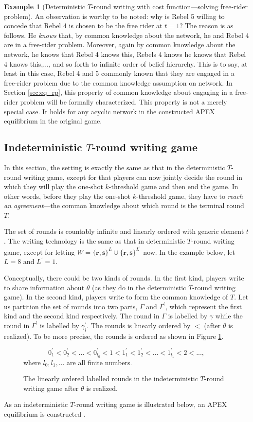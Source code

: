\documentclass[12pt,letter]{article}
\theoremstyle{definition}
\newtheorem{example}{Example}
\theoremstyle{remark}
\theoremstyle{claim}
\begin{document}
\begin{example}[Deterministic $T$-round writing with cost function---solving free-rider problem]
An observation is worthy to be noted: why is Rebel 5 willing to concede that Rebel 4 is chosen to be the free rider at $t=1$? The reason is as follows. He \textit{knows} that, by common knowledge about the network, he and Rebel 4 are in a free-rider problem. Moreover, again by common knowledge about the network, he knows that Rebel 4 knows this, Rebels 4 knows he knows that Rebel 4 knows this,..., and so forth to infinite order of belief hierarchy. This is to say, at least in this case, Rebel 4 and 5 commonly known that they are engaged in a free-rider problem due to the common knowledge assumption on network. In Section \ref{sec:eq_rp}, this property of common knowledge about engaging in a free-rider problem will be formally characterized. This property is not a merely special case. It holds for any acyclic network in the constructed APEX equilibrium in the original game.  

\end{example}


\subsection{Indeterministic $T$-round writing game}
In this section, the setting is exactly the same as that in the deterministic $T$-round writing game, except for that players can now jointly decide the round in which they will play the one-shot $k$-threshold game and then end the game. In other words, before they play the one-shot $k$-threshold game, they have to \textit{reach an agreement}---the common knowledge about which round is the terminal round ${T}$. 

The set of rounds is countably infinite and linearly ordered with generic element $t$. The writing technology is the same as that in deterministic $T$-round writing game, except for letting $W=\{\textbf{r},\textbf{s}\}^L\cup \{\textbf{r},\textbf{s}\}^{L^{'}}$ now. In the example below, let $L=8$ and $L^{'}=1$. 

Conceptually, there could be two kinds of rounds. In the first kind, players write to share information about $\theta$ (as they do in the deterministic $T$-round writing game). In the second kind, players write to form the common knowledge of ${T}$. Let us partition the set of rounds into two parts, $\Gamma$ and $\Gamma^{'}$, which represent the first kind and the second kind respectively. The round in $\Gamma$ is labelled by $\gamma$ while the round in $\Gamma^{'}$ is labelled by $\gamma^{'}_l$. The rounds is linearly ordered by $<$ (after $\theta$ is realized). To be more precise, the rounds is ordered as shown in Figure \ref{fig:ordered_writing}.
\begin{figure}
\caption{The linearly ordered labelled rounds in the indeterministic $T$-round writing game after $\theta$ is realized.}
\label{fig:ordered_writing}
\[0^{'}_1<0^{'}_2<...<0^{'}_{l_0}<1<1^{'}_{1}<1^{'}_{2}<...<1^{'}_{l_1}<2<...,\]
where $l_0,l_1,...$ are all finite numbers.

\end{figure}
As an indeterministic $T$-round writing game is illustrated below, an APEX equilibrium is constructed .
\end{document}
